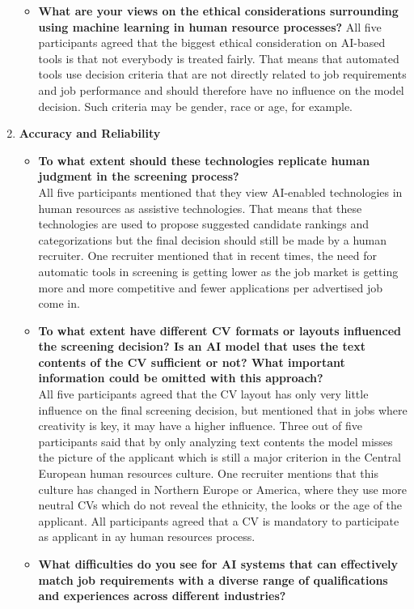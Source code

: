 \documentclass[draft,final]{thesisclass} %
\begin{document}
\begin{enumerate}
\begin{itemize}
        \item \textbf{What are your views on the ethical considerations surrounding using machine learning in human resource processes?}
        All five participants agreed that the biggest ethical consideration on \acs{AI}-based tools is that not everybody is treated fairly. That means that automated tools use decision criteria that are not directly related to job requirements and job performance and should therefore have no influence on the model decision. Such criteria may be gender, race or age, for example.
    \end{itemize}
    \item \textbf{Accuracy and Reliability}
    \begin{itemize}
        \item \textbf{To what extent should these technologies replicate human judgment in the screening process?}\\
        All five participants mentioned that they view \acs{AI}-enabled technologies in human resources as assistive technologies.
        That means that these technologies are used to propose suggested candidate rankings and categorizations but the final decision should still be made by a human recruiter. One recruiter mentioned that in recent times, the need for automatic tools in screening is getting lower as the job market is getting more and more competitive and fewer applications per advertised job come in. 
        \item \textbf{To what extent have different \acs{CV} formats or layouts influenced the screening decision? Is an \acs{AI} model that uses the text contents of the \acs{CV} sufficient or not? What important information could be omitted with this approach?}\\
        All five participants agreed that the \acs{CV} layout has only very little influence on the final screening decision, but mentioned that in jobs where creativity is key, it may have a higher influence. Three out of five participants said that by only analyzing text contents the model misses the picture of the applicant which is still a major criterion in the Central European human resources culture. One recruiter mentions that this culture has changed in Northern Europe or America, where they use more neutral \acs{CV}s which do not reveal the ethnicity, the looks or the age of the applicant. All participants agreed that a \acs{CV} is mandatory to participate as applicant in ay human resources process.
        \item \textbf{What difficulties do you see for \acs{AI} systems that can effectively match job requirements with a diverse range of qualifications and experiences across different industries?}\\

\end{itemize}
\end{enumerate}
\end{document}
